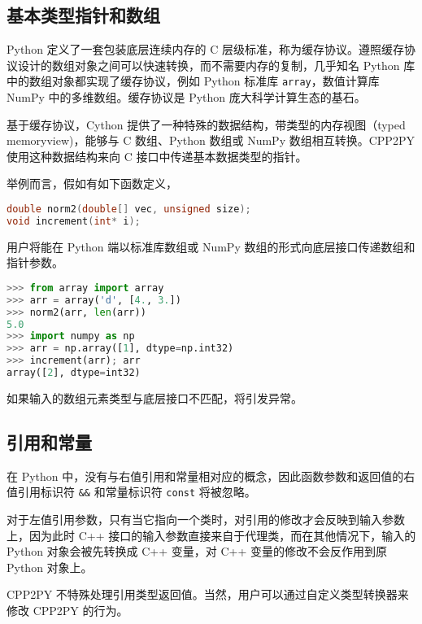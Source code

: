 \subsection{基本类型指针和数组}

Python 定义了一套包装底层连续内存的 C 层级标准，称为缓存协议。遵照缓存协议设计的数组对象之间可以快速转换，而不需要内存的复制，几乎知名 Python 库中的数组对象都实现了缓存协议，例如 Python 标准库 \lstinline{array}，数值计算库 NumPy 中的多维数组。缓存协议是 Python 庞大科学计算生态的基石。

基于缓存协议，Cython 提供了一种特殊的数据结构，带类型的内存视图（typed memoryview)，能够与 C 数组、Python 数组或 NumPy 数组相互转换。CPP2PY 使用这种数据结构来向 C 接口中传递基本数据类型的指针。

举例而言，假如有如下函数定义，

\begin{framed}
\begin{lstlisting}[language=c++]
double norm2(double[] vec, unsigned size);
void increment(int* i);
\end{lstlisting}
\end{framed}
用户将能在 Python 端以标准库数组或 NumPy 数组的形式向底层接口传递数组和指针参数。
\begin{framed}
\begin{lstlisting}[language=python]
>>> from array import array
>>> arr = array('d', [4., 3.])
>>> norm2(arr, len(arr))
5.0
>>> import numpy as np
>>> arr = np.array([1], dtype=np.int32)
>>> increment(arr); arr
array([2], dtype=int32)
\end{lstlisting}
\end{framed}

如果输入的数组元素类型与底层接口不匹配，将引发异常。

\subsection{引用和常量}

在 Python 中，没有与右值引用和常量相对应的概念，因此函数参数和返回值的右值引用标识符 \lstinline{&&} 和常量标识符 \lstinline{const} 将被忽略。

对于左值引用参数，只有当它指向一个类时，对引用的修改才会反映到输入参数上，因为此时 C++ 接口的输入参数直接来自于代理类，而在其他情况下，输入的 Python 对象会被先转换成 C++ 变量，对 C++ 变量的修改不会反作用到原 Python 对象上。

CPP2PY 不特殊处理引用类型返回值。当然，用户可以通过自定义类型转换器来修改 CPP2PY 的行为。

